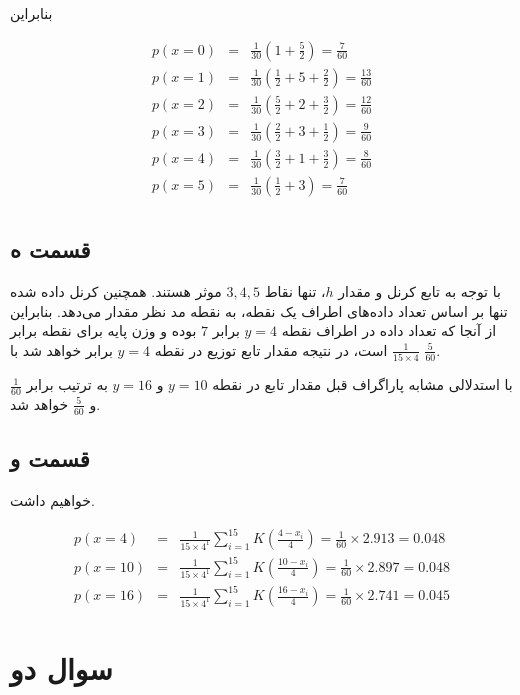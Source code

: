 \documentclass{article}
\begin{document}
بنابراین

\begin{eqnarray*}
    p(x=0) & = & \frac{1}{30} (1 + \frac{5}{2}) = \frac{7}{60} \\
    p(x=1) & = & \frac{1}{30} (\frac{1}{2} + 5 + \frac{2}{2}) = \frac{13}{60} \\
    p(x=2) & = & \frac{1}{30} (\frac{5}{2} + 2 + \frac{3}{2}) = \frac{12}{60} \\
    p(x=3) & = & \frac{1}{30} (\frac{2}{2} + 3 + \frac{1}{2}) = \frac{9}{60} \\
    p(x=4) & = & \frac{1}{30} (\frac{3}{2} + 1 + \frac{3}{2}) = \frac{8}{60} \\
    p(x=5) & = & \frac{1}{30} (\frac{1}{2} + 3 ) = \frac{7}{60} \\
\end{eqnarray*}

\subsection*{قسمت ه}

با توجه به تابع کرنل و مقدار $h$، تنها نقاط $3, 4, 5$ موثر هستند. همچنین کرنل داده شده
تنها بر اساس تعداد داده‌های اطراف یک نقطه، به نقطه مد نظر مقدار می‌دهد. بنابراین از آنجا که
تعداد داده در اطراف نقطه $y=4$ برابر $7$ بوده و وزن پایه برای نقطه برابر $\frac{1}{15 \times 4}$ است،
در نتیجه مقدار تابع توزیع در نقطه $y=4$ برابر خواهد شد با $\frac{5}{60}$.

با استدلالی مشابه پاراگراف قبل مقدار تابع در نقطه $y=10$ و $y=16$ به ترتیب
برابر $\frac{1}{60}$ و $\frac{5}{60}$ خواهد شد.

\subsection*{قسمت و}

خواهیم داشت.

\begin{eqnarray*}
    p(x=4) & = & \frac{1}{15 \times 4^1} \sum_{i=1}^{15} K(\frac{4-x_i}{4}) = \frac{1}{60} \times 2.913 = 0.048 \\
    p(x=10) & = & \frac{1}{15 \times 4^1} \sum_{i=1}^{15} K(\frac{10-x_i}{4}) = \frac{1}{60} \times 2.897 = 0.048 \\
    p(x=16) & = & \frac{1}{15 \times 4^1} \sum_{i=1}^{15} K(\frac{16-x_i}{4}) = \frac{1}{60} \times 2.741 = 0.045
\end{eqnarray*}

\section*{سوال دو}
\end{document}
